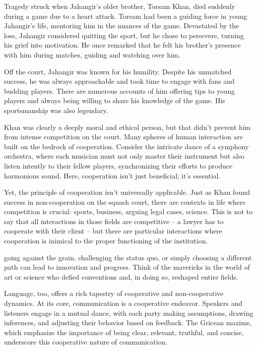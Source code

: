 Tragedy struck when Jahangir's older brother, Torsam Khan, died suddenly during a game due to a heart attack. Torsam had been a guiding force in young Jahangir's life, mentoring him in the nuances of the game. Devastated by the loss, Jahangir considered quitting the sport, but he chose to persevere, turning his grief into motivation. He once remarked that he felt his brother's presence with him during matches, guiding and watching over him.

Off the court, Jahangir was known for his humility. Despite his unmatched success, he was always approachable and took time to engage with fans and budding players. There are numerous accounts of him offering tips to young players and always being willing to share his knowledge of the game. His sportsmanship was also legendary. 

Khan was clearly a deeply moral and ethical person, but that didn't prevent him from intense competition on the court. Many spheres of human interaction are built on the bedrock of cooperation. Consider the intricate dance of a symphony orchestra, where each musician must not only master their instrument but also listen intently to their fellow players, synchronizing their efforts to produce harmonious sound. Here, cooperation isn't just beneficial; it's essential.

Yet, the principle of cooperation isn't universally applicable. Just as Khan found success in non-cooperation on the squash court, there are contexts in life where competition is crucial: sports, business, arguing legal cases, science. This is not to say that all interactions in those fields are competitive -- a lawyer has to cooperate with their client -- but there are particular interactions where cooperation is inimical to the proper functioning of the institution.

going against the grain, challenging the status quo, or simply choosing a different path can lead to innovation and progress. Think of the mavericks in the world of art or science who defied conventions and, in doing so, reshaped entire fields.

Language, too, offers a rich tapestry of cooperative and non-cooperative dynamics. At its core, communication is a cooperative endeavor. Speakers and listeners engage in a mutual dance, with each party making assumptions, drawing inferences, and adjusting their behavior based on feedback. The Gricean maxims, which emphasize the importance of being clear, relevant, truthful, and concise, underscore this cooperative nature of communication.

